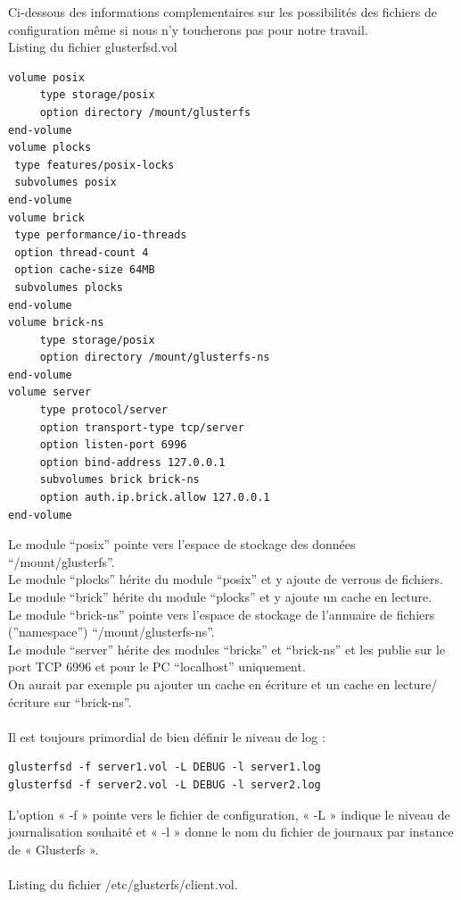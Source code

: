 \documentclass[12pt]{report}
\begin{document}
Ci-dessous des informations complementaires sur les possibilités des fichiers de configuration même si nous n'y toucherons pas pour notre travail.\\
Listing du fichier glusterfsd.vol
\begin{lstlisting}
volume posix
     type storage/posix
     option directory /mount/glusterfs
end-volume
volume plocks
 type features/posix-locks
 subvolumes posix
end-volume
volume brick
 type performance/io-threads
 option thread-count 4
 option cache-size 64MB
 subvolumes plocks
end-volume
volume brick-ns
     type storage/posix
     option directory /mount/glusterfs-ns
end-volume
volume server
     type protocol/server
     option transport-type tcp/server
     option listen-port 6996
     option bind-address 127.0.0.1
     subvolumes brick brick-ns
     option auth.ip.brick.allow 127.0.0.1
end-volume
	  \end{lstlisting}
Le module “posix” pointe vers l'espace de stockage des données “/mount/glusterfs”.\\
Le module “plocks” hérite du module “posix” et y ajoute de verrous de fichiers.\\
Le module “brick” hérite du module “plocks” et y ajoute un cache en lecture.\\
Le module “brick-ns” pointe vers l'espace de stockage de l'annuaire de fichiers (”namespace”) “/mount/glusterfs-ns”.\\
Le module “server” hérite des modules “bricks” et “brick-ns” et les publie sur le port TCP 6996 et pour le PC “localhost” uniquement.\\
On aurait par exemple pu ajouter un cache en écriture et un cache en lecture/écriture sur “brick-ns”.\\\\
Il est toujours primordial de bien définir le niveau de log :
\begin{lstlisting}
glusterfsd -f server1.vol -L DEBUG -l server1.log
glusterfsd -f server2.vol -L DEBUG -l server2.log
	  \end{lstlisting}
L'option « -f » pointe vers le fichier de configuration, « -L » indique le niveau de journalisation souhaité et « -l » donne le nom du fichier de journaux par
instance de « Glusterfs ».\\\\
Listing du fichier /etc/glusterfs/client.vol.
\end{document}
